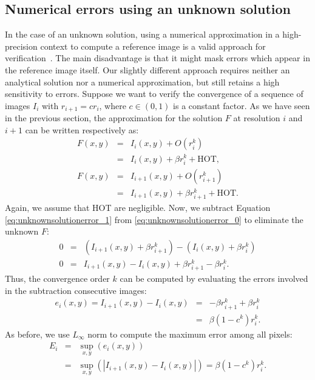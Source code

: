 \subsection{Numerical errors using an unknown solution}

In the case of an unknown solution, using a numerical approximation in
a high-precision context to compute a reference image is a valid
approach for verification~\cite{Kronander10}.  The main disadvantage
is that it might mask errors which appear in the reference image
itself.
%
Our slightly different approach requires
neither an analytical solution nor a numerical approximation, but
still retains a high sensitivity to errors. Suppose
we want to verify the convergence of a sequence of images ${I_i}$
with $r_{i+1} = c r_{i}$, where $c \in (0,1)$ is a constant
factor. 
%
As we have seen in the previous section, the approximation for the
solution $F$ at resolution $i$ and $i+1$ can be written respectively as: 
\begin{eqnarray}
F(x,y) &=&I_i(x,y) + O(r_i^k) \nonumber\\
&=& I_i(x,y) + \beta r_i^k + \text{HOT},\label{eq:unknownsolutionerror_0} \\
F(x,y) &=& I_{i+1}(x,y) + O(r_{i+1}^k) \nonumber\\
&=& I_{i+1}(x,y) + \beta
r_{i+1}^k + \text{HOT}. \label{eq:unknownsolutionerror_1}
\end{eqnarray}
Again, we assume that HOT are negligible. Now, we 
subtract Equation \eqref{eq:unknownsolutionerror_1} from
\eqref{eq:unknownsolutionerror_0} to eliminate the unknown $F$:
\begin{eqnarray}
0 &=& (I_{i+1}(x,y) + \beta r_{i+1}^k) - (I_i(x,y) + \beta r_i^k)\\
0 &=& I_{i+1}(x,y)-I_{i}(x,y) + \beta r_{i+1}^k - \beta r_i^k.
\end{eqnarray}
Thus, the convergence order $k$ can be computed by evaluating the errors
involved in the subtraction consecutive images:
\begin{eqnarray}
e_i(x,y) = I_{i+1}(x,y)-I_{i}(x,y) &=& -\beta r_{i+1}^k + \beta r_i^k\\
  &=& \beta(1 -c^k) r_i^k.
\end{eqnarray}
As before, we use $L_\infty$ norm to compute the maximum error among
all pixels:
\begin{eqnarray}
E_i &=& \sup_{x,y}(e_i(x,y))\nonumber\\ 
    &=& \sup_{x,y}(|I_{i+1}(x,y)-I_{i}(x,y)|) = \beta(1-c^k) r_i^k.\label{eq:unknownsolutionerror}
\end{eqnarray}
